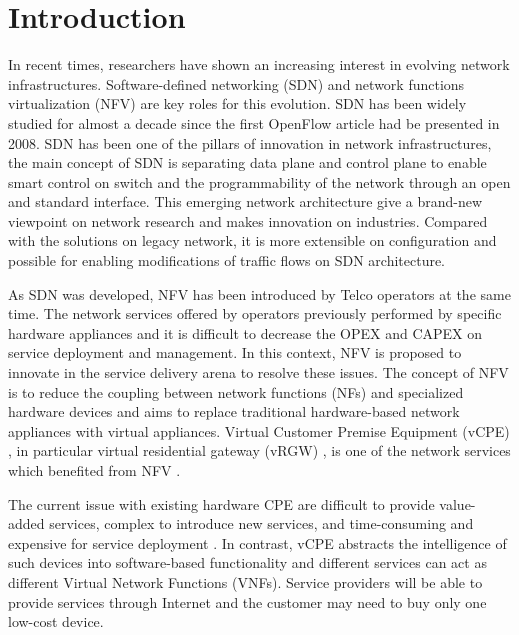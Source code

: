 \chapter{Introduction}
In recent times, researchers have shown an increasing interest in evolving network infrastructures.
Software-defined networking (SDN) and network functions virtualization (NFV) are key roles for this evolution.
SDN \cite{sdn-mckeown-2009-talk, sdn-newnorm, sdn-road, sdn-compre-survey} has been widely studied for almost a decade since the first OpenFlow \cite{openflow-mckeown-2008, openflow-spec} article had be presented in 2008.
SDN has been one of the pillars of innovation in network infrastructures, the main concept of SDN is separating data plane and control plane to enable smart control on switch and the programmability of the network through an open and standard interface\cite{sdn-define}.
This emerging network architecture give a brand-new viewpoint on network research and makes innovation on industries.
Compared with the solutions on legacy network, it is more extensible on configuration and possible for enabling modifications of traffic flows on SDN architecture.

As SDN was developed, NFV \cite{nfv-wp, etsi-nfv-archi, nfv-survey} has been introduced by Telco operators at the same time.
The network services offered by operators previously performed by specific hardware appliances and it is difficult to decrease the OPEX and CAPEX on service deployment and management.
In this context, NFV is proposed to innovate in the service delivery arena to resolve these issues.
The concept of NFV is to reduce the coupling between network functions (NFs) and specialized hardware devices and aims to replace traditional hardware-based network appliances with virtual appliances.
Virtual Customer Premise Equipment (vCPE) \cite{nec-vcpe, vcpe-enhance}, in particular virtual residential gateway (vRGW) \cite{nfv-home}, is one of the network services which benefited from NFV \cite{etsi-nfv-usecase}.


The current issue with existing hardware CPE are difficult to provide value-added services, complex to introduce new services, and time-consuming and expensive for service deployment \cite{nec-vcpe}.
In contrast, vCPE abstracts the intelligence of such devices into software-based functionality and different services can act as different Virtual Network Functions (VNFs).
Service providers will be able to provide services through Internet and the customer may need to buy only one low-cost device.

